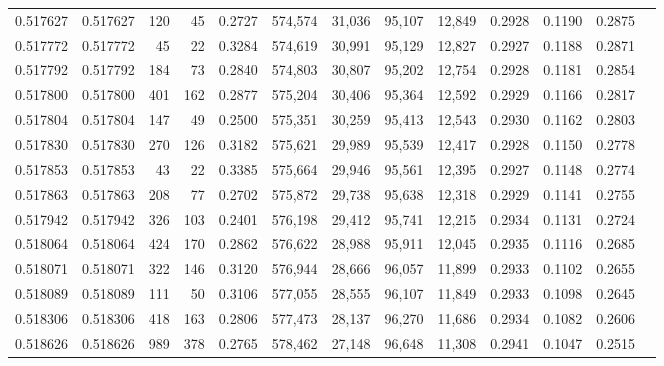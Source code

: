 \begin{tabular}{rrrrrrrrrrrrr}
0.517627 & 0.517627 &   120 &    45 &                                     0.2727 & 574,574 &  31,036 &  95,107 &  12,849 & 0.2928 & 0.1190 & 0.2875 \\
0.517772 & 0.517772 &    45 &    22 &                                     0.3284 & 574,619 &  30,991 &  95,129 &  12,827 & 0.2927 & 0.1188 & 0.2871 \\
0.517792 & 0.517792 &   184 &    73 &                                     0.2840 & 574,803 &  30,807 &  95,202 &  12,754 & 0.2928 & 0.1181 & 0.2854 \\
0.517800 & 0.517800 &   401 &   162 &                                     0.2877 & 575,204 &  30,406 &  95,364 &  12,592 & 0.2929 & 0.1166 & 0.2817 \\
0.517804 & 0.517804 &   147 &    49 &                                     0.2500 & 575,351 &  30,259 &  95,413 &  12,543 & 0.2930 & 0.1162 & 0.2803 \\
0.517830 & 0.517830 &   270 &   126 &                                     0.3182 & 575,621 &  29,989 &  95,539 &  12,417 & 0.2928 & 0.1150 & 0.2778 \\
0.517853 & 0.517853 &    43 &    22 &                                     0.3385 & 575,664 &  29,946 &  95,561 &  12,395 & 0.2927 & 0.1148 & 0.2774 \\
0.517863 & 0.517863 &   208 &    77 &                                     0.2702 & 575,872 &  29,738 &  95,638 &  12,318 & 0.2929 & 0.1141 & 0.2755 \\
0.517942 & 0.517942 &   326 &   103 &                                     0.2401 & 576,198 &  29,412 &  95,741 &  12,215 & 0.2934 & 0.1131 & 0.2724 \\
0.518064 & 0.518064 &   424 &   170 &                                     0.2862 & 576,622 &  28,988 &  95,911 &  12,045 & 0.2935 & 0.1116 & 0.2685 \\
0.518071 & 0.518071 &   322 &   146 &                                     0.3120 & 576,944 &  28,666 &  96,057 &  11,899 & 0.2933 & 0.1102 & 0.2655 \\
0.518089 & 0.518089 &   111 &    50 &                                     0.3106 & 577,055 &  28,555 &  96,107 &  11,849 & 0.2933 & 0.1098 & 0.2645 \\
0.518306 & 0.518306 &   418 &   163 &                                     0.2806 & 577,473 &  28,137 &  96,270 &  11,686 & 0.2934 & 0.1082 & 0.2606 \\
0.518626 & 0.518626 &   989 &   378 &                                     0.2765 & 578,462 &  27,148 &  96,648 &  11,308 & 0.2941 & 0.1047 & 0.2515 \\

\end{tabular}
